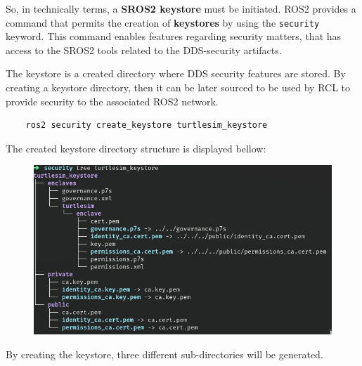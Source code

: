 So, in technically terms, a \textbf{SROS2 keystore} must be initiated. ROS2 provides a command that permits the creation of \textbf{keystores} by using the \texttt{security} keyword. This command enables features regarding security matters, that has access to the SROS2 tools related to the DDS-security artifacts.

The keystore is a created directory where DDS security features are stored. By creating a keystore directory, then it can be later sourced to be used by RCL to provide security to the associated ROS2 network.
            
\begin{verbatim}
    ros2 security create_keystore turtlesim_keystore
\end{verbatim}

The created keystore directory structure is displayed bellow:

\begin{figure}[H]
    \centering
    \includegraphics[width=0.6\linewidth]{images/ts_keystore_tree.png}
\end{figure}

By creating the keystore, three different sub-directories will be generated.

